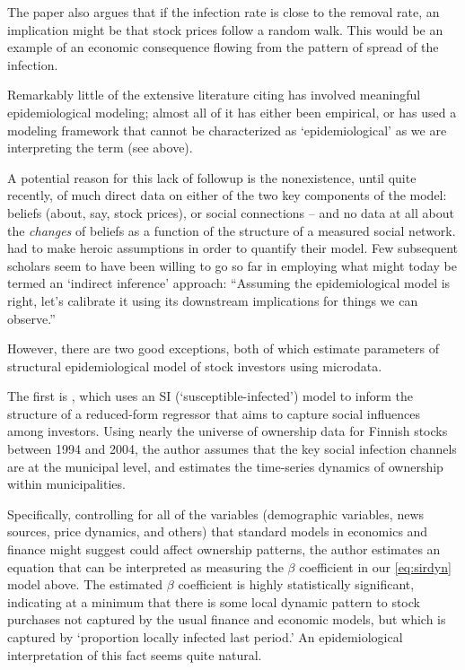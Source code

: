 The paper also argues that if the infection rate is close to the removal rate, an implication might be that stock prices follow a random walk.  This would be an example of an economic consequence flowing from the pattern of spread of the infection.

Remarkably little of the extensive literature citing \cite{shiller1989survey} has involved meaningful epidemiological modeling; almost all of it has either been empirical, or has used a modeling framework that cannot be characterized as `epidemiological' as we are interpreting the term (see above).

A potential reason for this lack of followup is the nonexistence, until quite recently, of much direct data on either of the two key components of the model: beliefs (about, say, stock prices), or social connections -- and no data at all about the \textit{changes} of beliefs as a function of the structure of a measured social network.  \cite{shiller1989survey} had to make heroic assumptions in order to quantify their model.  Few subsequent scholars seem to have been willing to go so far in employing what might today be termed an `indirect inference' approach: ``Assuming the epidemiological model is right, let's calibrate it using its downstream implications for things we can observe.''

However, there are two good exceptions, both of which estimate parameters of structural epidemiological model of stock investors using microdata.

The first is  \href{https://github.com/iworld1991/EpiExp/blob/master/Literature/shive2010epidemic.pdf}{\cite{shive2010epidemic}}, which uses an SI (`susceptible-infected') model to inform the structure of a reduced-form regressor that aims to capture social influences among investors.  Using nearly the universe of ownership data for Finnish stocks between 1994 and 2004, the author assumes that the key social infection channels are at the municipal level, and estimates the time-series dynamics of ownership within municipalities.

Specifically, controlling for all of the variables (demographic variables, news sources, price dynamics, and others) that standard models in economics and finance might suggest could affect ownership patterns, the author estimates an equation that can be interpreted as measuring the $\beta$ coefficient in our \eqref{eq:sirdyn} model above.  The estimated $\beta$ coefficient is highly statistically significant, indicating at a minimum that there is some local dynamic pattern to stock purchases not captured by the usual finance and economic models, but which is captured by `proportion locally infected last period.'  An epidemiological interpretation of this fact seems quite natural.


